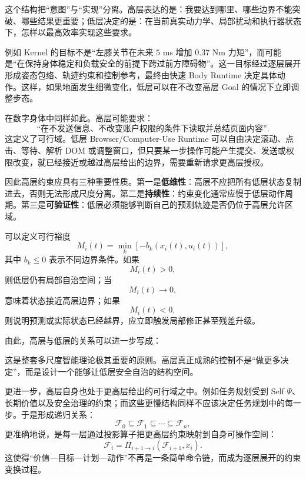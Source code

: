 这个结构把``意图''与``实现''分离。高层表达的是：我要达到哪里、哪些边界不能突破、哪些结果更重要；低层决定的是：在当前真实动力学、局部扰动和执行器状态下，怎样以最高效率实现这些要求。

例如 Kernel 的目标不是``左膝关节在未来 $5$ ms 增加 $0.37$ Nm 力矩''，而可能是``在保持身体稳定和负载安全的前提下跨过前方障碍物''。这一目标经过逐层展开形成姿态包络、轨迹约束和控制参考，最终由快速 Body Runtime 决定具体动作。这样，如果地面发生细微变化，低层可以在不改变高层 Goal 的情况下立即调整步态。

在数字身体中同样如此。高层可能要求：
\[
\text{``在不发送信息、不改变账户权限的条件下读取并总结页面内容''}.
\]
这定义了可行域。低层 Browser/Computer-Use Runtime 可以自由决定滚动、点击、等待、解析 DOM 或调整窗口，但只要某一步操作可能产生提交、发送或权限改变，就已经接近或越过高层给出的边界，需要重新请求更高层授权。

因此高层约束应具有三种重要性质。第一是\textbf{低维性}：高层不应把所有低层状态复制进去，否则无法形成尺度分离。第二是\textbf{持续性}：约束变化通常应慢于低层动作周期。第三是\textbf{可验证性}：低层必须能够判断自己的预测轨迹是否仍位于高层允许区域。

可以定义可行裕度
\begin{equation}
M_i(t)
=
\min_{k}
\left[
-b_k(x_i(t),u_i(t))
\right],
\end{equation}
其中 $b_k\leq 0$ 表示不同边界条件。如果
\[
M_i(t)>0,
\]
则低层仍有局部自治空间；当
\[
M_i(t)\rightarrow 0,
\]
意味着状态接近高层边界；如果
\[
M_i(t)<0,
\]
则说明预测或实际状态已经越界，应立即触发局部修正甚至残差升级。

由此，高层与低层的关系可以进一步写成：
\begin{statementbox}
\centering
{}
\end{statementbox}
这是整套多尺度智能理论极其重要的原则。高层真正成熟的控制不是``做更多决定''，而是设计一个能够让低层安全自治的结构空间。

更进一步，高层自身也处于更高层给出的可行域之中。例如任务规划受到 Self $\Psi$、长期价值以及安全治理的约束；而这些更慢结构同样不应该决定任务规划中的每一步。于是形成递归关系：
\begin{equation}
\mathcal F_0
\subseteq
\mathcal F_1
\subseteq
\cdots
\subseteq
\mathcal F_n,
\end{equation}
更准确地说，是每一层通过投影算子把更高层约束映射到自身可操作空间：
\begin{equation}
\mathcal F_i
=
\Pi_{i+1\to i}
\left(
\mathcal F_{i+1},
x_i
\right).
\end{equation}
这使得``价值---目标---计划---动作''不再是一条简单命令链，而成为逐层展开的约束变换过程。

